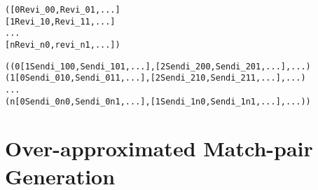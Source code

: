 

\newsavebox{\boxReviList}
\begin{lrbox}{\boxReviList}
\begin{minipage}[c]{0.4\linewidth}
\begin{alltt}
([0 Revi_00, Revi_01, ...]
 [1 Revi_10, Revi_11, ...]
 ...
 [n Revi_n0, revi_n1, ...])
\end{alltt}
\end{minipage}
\end{lrbox}

\newsavebox{\boxSendiList}
\begin{lrbox}{\boxSendiList}
\begin{minipage}[c]{0.4\linewidth}
\begin{alltt}
((0 [1 Sendi_100, Sendi_101, ...], [2 Sendi_200, Sendi_201, ...], ...)
 (1 [0 Sendi_010, Sendi_011, ...], [2 Sendi_210, Sendi_211, ...], ...)
 ...
 (n [0 Sendi_0n0, Sendi_0n1, ...], [1 Sendi_1n0, Sendi_1n1, ...], ...))

\end{alltt}
\end{minipage}
\end{lrbox}

\section{ Over-approximated Match-pair Generation}


